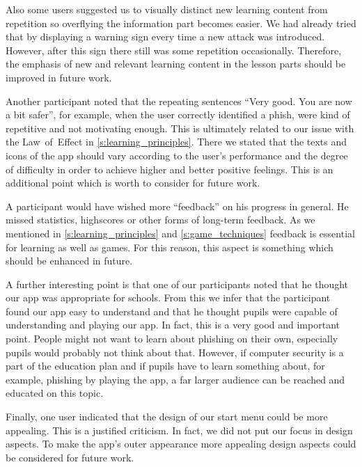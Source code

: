 \begin{description}[leftmargin=0cm]
Also some users suggested us to visually distinct new learning content from repetition so overflying the information part becomes easier. 
We had already tried that by displaying a warning sign every time a new attack was introduced.
However, after this sign there still was some repetition occasionally.
Therefore, the emphasis of new and relevant learning content in the lesson parts should be improved in future work.

Another participant noted that the repeating sentences ``Very good. You are now a bit safer'', for example, when the user correctly identified a phish, were kind of repetitive and not motivating enough. This is ultimately related to our issue with the Law~of~Effect in \autoref{s:learning_principles}.
There we stated that the texts and icons of the app should vary according to the user's performance and the degree of difficulty in order to achieve higher and better positive feelings.
This is an additional point which is worth to consider for future work.

A participant would have wished more ``feedback'' on his progress in general. 
He missed statistics, highscores or other forms of long-term feedback.
As we mentioned in \autoref{s:learning_principles} and \autoref{s:game_techniques} feedback is essential for learning as well as games.
For this reason, this aspect is something which should be enhanced in future.

A further interesting point is that one of our participants noted that he thought our app was appropriate for schools.
From this we infer that the participant found our app easy to understand and that he thought pupils were capable of understanding and playing our app.
In fact, this is a very good and important point.
People might not want to learn about phishing on their own, especially pupils would probably not think about that.
However, if computer security is a part of the education plan and if pupils have to learn something about, for example, phishing by playing the app, a far larger audience can be reached and educated on this topic.	

Finally, one user indicated that the design of our start menu could be more appealing.
This is a justified criticism.
In fact, we did not put our focus in design aspects.
To make the app's outer appearance more appealing design aspects could be considered for future work.
\end{description}

